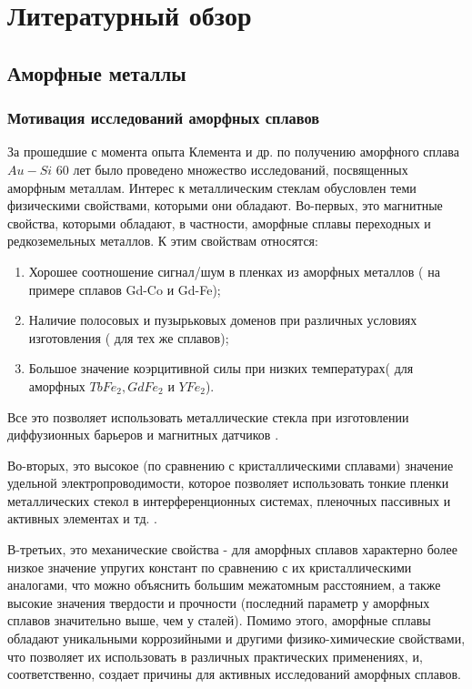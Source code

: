 \chapter{Литературный обзор}
\section{Аморфные металлы}
\subsection{Мотивация исследований аморфных сплавов}
За прошедшие с момента опыта Клемента и др. по получению аморфного сплава $Au-Si$ \cite{Klement} 60 лет было проведено множество исследований, посвященных аморфным металлам. Интерес к металлическим стеклам обусловлен теми физическими свойствами, которыми они обладают. Во-первых, это магнитные свойства, которыми обладают, в частности, аморфные сплавы переходных и редкоземельных металлов. К этим свойствам относятся:
\begin{enumerate}
	\item Хорошее соотношение сигнал/шум в пленках из аморфных металлов (\cite{Chaudhari} на примере сплавов Gd-Co и Gd-Fe);
	\item Наличие полосовых и пузырьковых доменов при различных условиях изготовления (\cite{Chadhauri2.0} для тех же сплавов);
	\item Большое значение коэрцитивной силы при низких температурах(\cite{Rhyne} для аморфных $TbFe_2, GdFe_2$ и $YFe_2$).
\end{enumerate} 
Все это позволяет использовать металлические стекла при изготовлении диффузионных барьеров и магнитных датчиков \cite{Zolotukhin}.


Во-вторых, это высокое (по сравнению с кристаллическими сплавами) значение удельной электропроводимости, которое позволяет использовать тонкие пленки металлических стекол в интерференционных системах, пленочных пассивных и активных элементах и тд. \cite{Antonets}.


В-третьих, это механические свойства - для аморфных сплавов характерно более низкое значение упругих констант по сравнению с их кристаллическими аналогами, что можно объяснить большим межатомным расстоянием, а также высокие значения твердости и прочности (последний параметр у аморфных сплавов значительно выше, чем у сталей)\cite{Kalin}. Помимо этого, аморфные сплавы обладают 
уникальными коррозийными и другими физико-химические свойствами, что позволяет их использовать в различных практических применениях, и, соответственно, создает причины для активных исследований аморфных сплавов.
